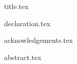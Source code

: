 
\pagestyle{empty}

{title.tex}

{declaration.tex}

{acknowledgements.tex}

{abstract.tex}

\tableofcontents

\blankpage

\pagestyle{fancy}

